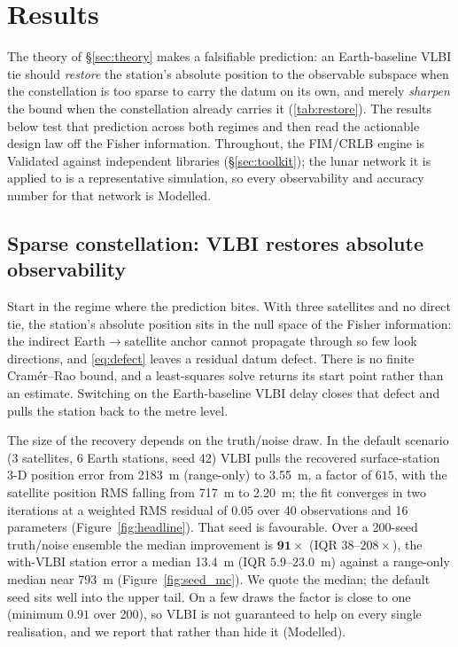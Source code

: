 \section{Results}
\label{sec:results}

The theory of \S\ref{sec:theory} makes a falsifiable prediction: an
Earth-baseline VLBI tie should \emph{restore} the station's absolute position to
the observable subspace when the constellation is too sparse to carry the datum
on its own, and merely \emph{sharpen} the bound when the constellation already
carries it (\ref{tab:restore}). The results below test that prediction across
both regimes and then read the actionable design law off the Fisher information.
Throughout, the FIM/CRLB engine is Validated against independent libraries
(\S\ref{sec:toolkit}); the lunar network it is applied to is a representative
simulation, so every observability and accuracy number for that network is
Modelled.

\subsection{Sparse constellation: VLBI restores absolute observability}

Start in the regime where the prediction bites. With three satellites and no
direct tie, the station's absolute position sits in the null space of the Fisher
information: the indirect Earth$\to$satellite anchor cannot propagate through so
few look directions, and \eqref{eq:defect} leaves a residual datum defect. There
is no finite Cram\'er--Rao bound, and a least-squares solve returns its start
point rather than an estimate. Switching on the Earth-baseline VLBI delay closes
that defect and pulls the station back to the metre level.

The size of the recovery depends on the truth/noise draw. In the default
scenario (3 satellites, 6 Earth stations, seed 42) VLBI pulls the recovered
surface-station 3-D position error from \SI{2183}{\meter} (range-only) to
\SI{3.55}{\meter}, a factor of $615$, with the satellite position RMS falling
from \SI{717}{\meter} to \SI{2.20}{\meter}; the fit converges in two iterations
at a weighted RMS residual of $0.05$ over 40 observations and 16 parameters
(Figure~\ref{fig:headline}). That seed is favourable. Over a 200-seed
truth/noise ensemble the median improvement is $\mathbf{91\times}$ (IQR
$38$--$208\times$), the with-VLBI station error a median \SI{13.4}{\meter} (IQR
$5.9$--$23.0$~m) against a range-only median near \SI{793}{\meter}
(Figure~\ref{fig:seed_mc}). We quote the median; the default seed sits well into
the upper tail. On a few draws the factor is close to one (minimum $0.91$ over
200), so VLBI is not guaranteed to help on every single realisation, and we
report that rather than hide it (Modelled).

